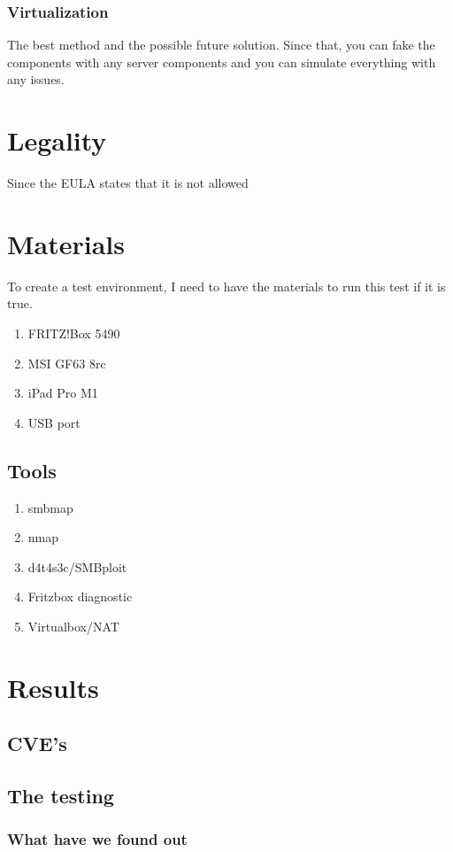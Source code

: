 \documentclass[12pt, letterpaper]{article}
\begin{document}
\subsubsection{Virtualization}
The best method and the possible future solution. Since that, you can fake the components with any server components and you can simulate everything with any issues.
\newpage
\section{Legality}
Since the EULA states that it is not allowed 
\section{Materials}
To create a test environment, I need to have the materials to run this test if it is true.
\begin{enumerate}[label=(\roman*)]
    \item FRITZ!Box 5490
    \item MSI GF63 8rc
    \item iPad Pro M1
    \item USB port
\end{enumerate}
\subsection{Tools}
\begin{enumerate}
    \item smbmap
    \item nmap
    \item d4t4s3c/SMBploit
    \item Fritzbox diagnostic
    \item Virtualbox/NAT
\end{enumerate}

\section{Results}


\subsection{CVE's}


\subsection{The testing}



\subsubsection{What have we found out}
\end{document}
